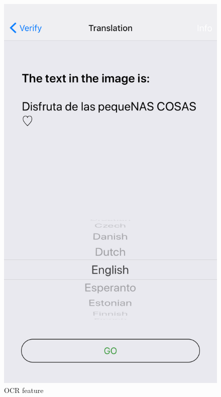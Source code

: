 \documentclass[12pt]{article}
\begin{document}
\begin{figure} [H]
\begin{minipage}{.5\textwidth}
  \includegraphics[width=0.9\linewidth]{media/case3.PNG}
  \caption{OCR feature}
  \label{fig:case3}
\end{minipage}
\end{figure}
\end{document}
